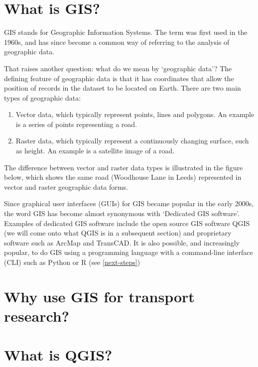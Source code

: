 \documentclass[10pt,a5paper,]{book}
\providecommand{\tightlist}{%
  \setlength{\itemsep}{0pt}\setlength{\parskip}{0pt}}
\begin{document}
\hypertarget{what-is-gis}{%
\section{What is GIS?}\label{what-is-gis}}

GIS stands for Geographic Information Systems.
The term was first used in the 1960s, and has since become a common way of referring to the analysis of geographic data.

That raises another question: what do we mean by `geographic data'?
The defining feature of geographic data is that it has coordinates that allow the position of records in the dataset to be located on Earth.
There are two main types of geographic data:

\begin{enumerate}
\def\labelenumi{\arabic{enumi}.}
\tightlist
\item
  Vector data, which typically represent points, lines and polygons. An example is a series of points representing a road.
\item
  Raster data, which typically represent a continuously changing surface, such as height.
  An example is a satellite image of a road.
\end{enumerate}

The difference between vector and raster data types is illustrated in the figure below, which shows the same road (Woodhouse Lane in Leeds) represented in vector and raster geographic data forms.

Since graphical user interfaces (GUIs) for GIS became popular in the early 2000s, the word GIS has become almost synonymous with `Dedicated GIS software'.
Examples of dedicated GIS software include the open source GIS software QGIS (we will come onto what QGIS is in a subsequent section) and proprietary software such as ArcMap and TransCAD.
It is also possible, and increasingly popular, to do GIS using a programming language with a command-line interface (CLI) such as Python or R (see \ref{next-steps})

\hypertarget{why-use-gis-for-transport-research}{%
\section{Why use GIS for transport research?}\label{why-use-gis-for-transport-research}}

\hypertarget{what-is-qgis}{%
\section{What is QGIS?}\label{what-is-qgis}}
\end{document}
